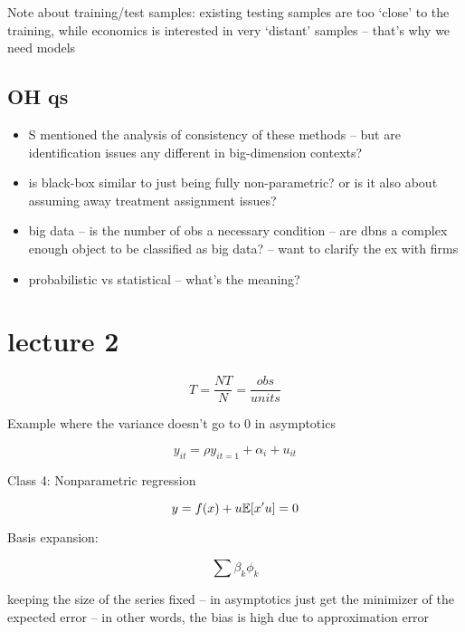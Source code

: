 \documentclass[a4paper,12pt,twoside]{article}
\begin{document}
Note about training/test samples: existing testing samples are too `close' to the training, while economics is interested in very `distant' samples -- that's why we need models


\subsection*{OH qs}

\begin{itemize}
	\item S mentioned the analysis of consistency of these methods -- but are identification issues any different in big-dimension contexts?
	\item is black-box similar to just being fully non-parametric? or is it also about assuming away treatment assignment issues?
	\item big data -- is the number of obs a necessary condition -- are dbns a complex enough object to be classified as big data? -- want to clarify the ex with firms
	\item probabilistic vs statistical -- what's the meaning?
\end{itemize}


\section*{lecture 2}


\begin{equation}
	T = \frac{NT}{N} = \frac{obs}{units}
\end{equation}

Example where the variance doesn't go to $0$ in asymptotics

\begin{equation}
	y_{it} = \rho y_{it=1} + \alpha_i + u_{it}
\end{equation}

Class 4: Nonparametric regression

\begin{equation}
	y = f(x) + u \\
	\mathbb{E} [x' u] = 0
\end{equation}

Basis expansion:

\begin{equation}
	\sum \beta_k \phi_k
\end{equation}


keeping the size of the series fixed -- in asymptotics just get the minimizer of the expected error -- in other words, the bias is high due to approximation error
\end{document}
